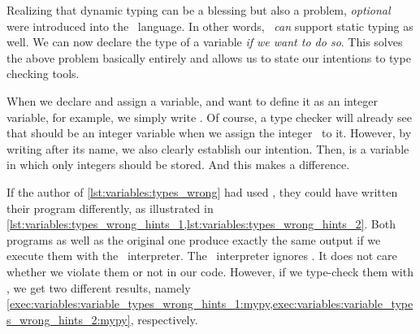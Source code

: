 Realizing that dynamic typing can be a blessing but also a problem, \emph{optional}  were introduced into the \python\ language.
In other words, \python\ \emph{can} support static typing as well.
We can now declare the type of a variable \emph{if we want to do so}.
This solves the above problem basically entirely and allows us to state our intentions to type checking tools.

When we declare and assign a variable,  and want to define it as an integer variable, for example, we simply write .
Of course, a type checker will already see that  should be an integer variable when we assign the integer~ to it.
However, by writing \pythonIdx{:} after its name, we also clearly establish our intention.
Then,  is a variable in which only integers should be stored.
And this makes a difference.

%
%
%
%
%
%
%
%
%

If the author of \cref{lst:variables:types_wrong} had used , they could have written their program differently, as illustrated in \cref{lst:variables:types_wrong_hints_1,lst:variables:types_wrong_hints_2}.
Both programs as well as the original one produce exactly the same output if we execute them with the \python\ interpreter.
The \python\ interpreter ignores .
It does not care whether we violate them or not in our code.
However, if we type-check them with \mypy, we get two different results, namely \cref{exec:variables:variable_types_wrong_hints_1:mypy,exec:variables:variable_types_wrong_hints_2:mypy}, respectively.

